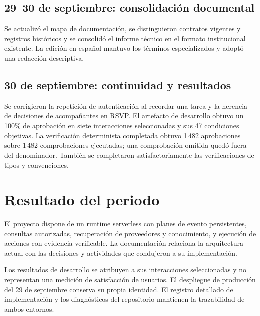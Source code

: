 \documentclass[
	a4paper,
	12pt,
]{CSSullivanBusinessReport}
\begin{document}
\subsection*{29--30 de septiembre: consolidación documental}
Se actualizó el mapa de documentación, se distinguieron contratos vigentes y registros históricos y se consolidó el informe técnico en el formato institucional existente. La edición en español mantuvo los términos especializados y adoptó una redacción descriptiva.

\subsection*{30 de septiembre: continuidad y resultados}
Se corrigieron la repetición de autenticación al recordar una tarea y la herencia de decisiones de acompañantes en RSVP. El artefacto de desarrollo obtuvo un 100\% de aprobación en siete interacciones seleccionadas y sus 47 condiciones objetivas. La verificación determinista completada obtuvo 1\,482 aprobaciones sobre 1\,482 comprobaciones ejecutadas; una comprobación omitida quedó fuera del denominador. También se completaron satisfactoriamente las verificaciones de tipos y convenciones.

\section{Resultado del periodo}
El proyecto dispone de un runtime serverless con planes de evento persistentes, consultas autorizadas, recuperación de proveedores y conocimiento, y ejecución de acciones con evidencia verificable. La documentación relaciona la arquitectura actual con las decisiones y actividades que condujeron a su implementación.

Los resultados de desarrollo se atribuyen a sus interacciones seleccionadas y no representan una medición de satisfacción de usuarios. El despliegue de producción del 29 de septiembre conserva su propia identidad. El registro detallado de implementación y los diagnósticos del repositorio mantienen la trazabilidad de ambos entornos.
\end{document}
